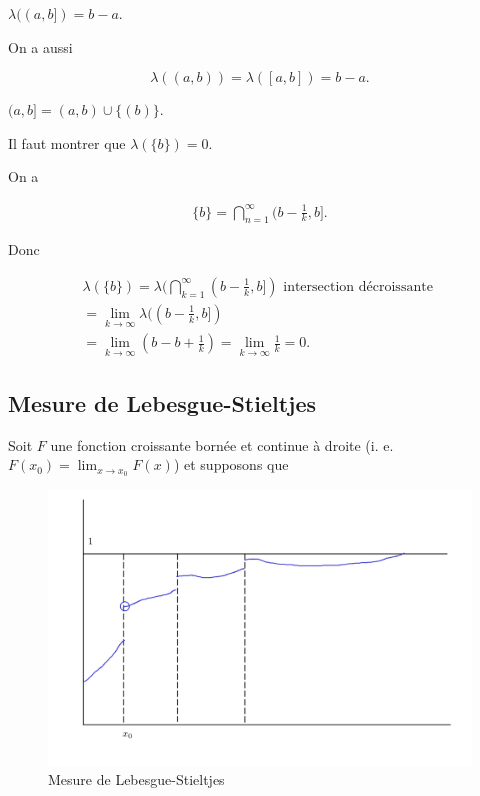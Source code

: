\documentclass[french]{book}
\theoremstyle{definition}
\theoremstyle{remark}
\begin{document}
$\lambda ( (a,b] ) = b-a$.

On a aussi

\begin{equation}\label{lebesgue-zero}
  \lambda ((a,b)) = \lambda ([a,b]) = b-a.
\end{equation}

$(a,b] = (a,b) \cup \{ (b)\}$.

Il faut montrer que $\lambda (\{ b \} ) = 0$.

On a

\begin{gather*}
  \{ b \} = \bigcap _{n=1} ^{\infty} (b- \frac{1}{k}, b].
\end{gather*}

Donc

\begin{gather*}
  \lambda (\{ b \} ) = \lambda (\bigcap _{k=1} ^{\infty} (b - \frac{1}{k}, b]) \text{ intersection décroissante } \\
  = \lim_{k \to \infty} \lambda ((b- \frac{1}{k}, b]) \\
  = \lim_{k \to \infty} (b-b+ \frac{1}{k}) = \lim_{k \to \infty} \frac{1}{k} = 0.
\end{gather*}

\subsection{Mesure de Lebesgue-Stieltjes}

Soit $F$ une fonction croissante bornée et continue à droite (i. e. $F(x_0) = \lim_{x \to x_0} F(x)$) et supposons que

\begin{figure}[h!]
  \centering
  \includegraphics[scale=0.2]{figures/lebesgue-stieltjes}
  \caption{Mesure de Lebesgue-Stieltjes}
  \label{}
\end{figure}
\end{document}
